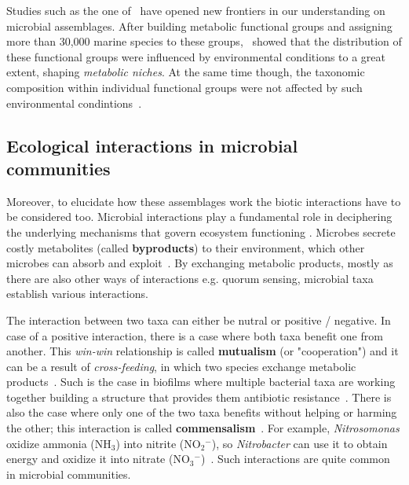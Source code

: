    Studies such as the one of~\citeauthor{louca2016decoupling}
   have opened new frontiers in our understanding on microbial assemblages. 
   After building metabolic functional groups and assigning more than 30,000 marine 
   species to these groups,~\citeauthor{louca2016decoupling} showed 
   that the distribution of these functional groups were influenced by environmental 
   conditions to a great extent, shaping \textit{metabolic niches}.
   At the same time though, the taxonomic composition within individual functional groups
   were not affected by such environmental condintions~\cite{louca2016decoupling}.

   \subsection{Ecological interactions in microbial communities}
   Moreover, to elucidate how these assemblages work the biotic interactions have to be 
   considered too. 
   Microbial interactions play a fundamental role in deciphering the underlying mechanisms that govern ecosystem functioning \cite{braga2016microbial, faust2012microbial}. 
   Microbes secrete costly metabolites (called \textbf{byproducts}) to their environment, 
   which other microbes can absorb and exploit~\cite{pacheco2019costless}.
   By exchanging metabolic products, mostly as there are also other ways of interactions 
   e.g. quorum sensing, microbial taxa establish various interactions. 
   
   The interaction between two taxa can either be nutral or 
   positive / negative.
   In case of a positive interaction, 
   there is a case where both taxa benefit one from another.
   This \textit{win-win} relationship is called \textbf{mutualism} (or "cooperation")
   and it can be a result of
   \textit{cross-feeding}, in which two species exchange metabolic products~\cite{faust2012microbial}.
   Such is the case in biofilms where multiple bacterial taxa are working together  
   building a structure that provides them antibiotic resistance~\cite{santos2019evolutionary}.
   There is also the case where only one of the two taxa
   benefits without helping or harming the other; 
   this interaction is called \textbf{commensalism}~\cite{faust2012microbial}. 
   For example, \textit{Nitrosomonas} oxidize ammonia (NH$_3$) into nitrite (NO${_2}^{-}$), so  
   \textit{Nitrobacter} can use it to obtain energy and oxidize it into nitrate (NO${_3}^{-}$)~\cite{laanbroek2002nitrite}.
   Such interactions are quite common in microbial communities.

